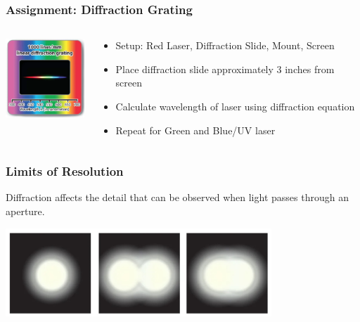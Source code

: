 \documentclass{beamer}
\begin{document}
\begin{frame}\frametitle{Assignment: Diffraction Grating}
\begin{columns}
\begin{column}{3cm}

\begin{center}
\includegraphics[width=3cm]{fig/diffslide.png}
\end{center}
\end{column}
\begin{column}{7.5cm}
\begin{itemize}
\item Setup: Red Laser, Diffraction Slide, Mount, Screen
\item Place diffraction slide approximately 3 inches from screen
\item Calculate wavelength of laser using diffraction equation
\item Repeat for Green and Blue/UV laser
\end{itemize}
\end{column}
\end{columns}
\end{frame}





\begin{frame}\frametitle{Limits of Resolution}

Diffraction affects the detail that can be observed when light passes through an aperture.

\vspace{0.5cm}

\begin{center}
\includegraphics[width=10cm]{fig/rayleigh1.jpg}
\end{center}

\end{frame}
\end{document}
